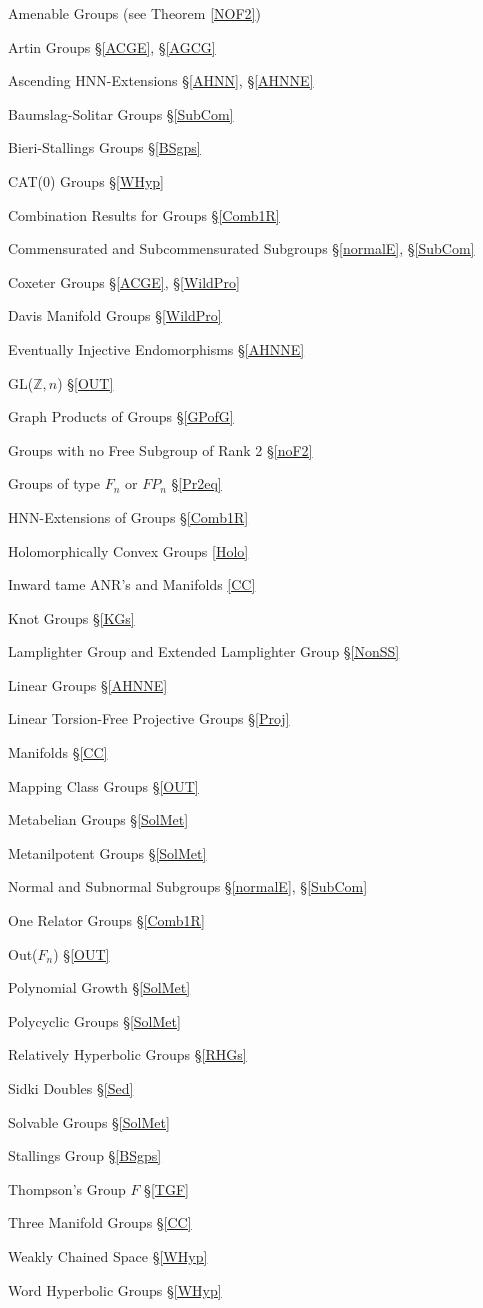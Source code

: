 \documentclass[12pt]{article}
\begin{document}
Amenable Groups (see Theorem \ref{NOF2})

Artin Groups \S \ref{ACGE}, \S \ref{AGCG}

Ascending HNN-Extensions \S \ref{AHNN}, \S \ref{AHNNE}

Baumslag-Solitar Groups \S \ref{SubCom}

Bieri-Stallings Groups \S \ref{BSgps}

CAT(0) Groups \S \ref{WHyp}

Combination Results for Groups \S \ref{Comb1R}

Commensurated and Subcommensurated Subgroups \S \ref{normalE}, \S \ref{SubCom} 

Coxeter Groups \S \ref{ACGE}, \S \ref{WildPro}

Davis Manifold Groups \S \ref{WildPro}

Eventually Injective Endomorphisms  \S \ref{AHNNE}

GL($\mathbb Z, n$)  \S \ref{OUT} 

Graph Products of Groups \S \ref{GPofG}

Groups with no Free Subgroup of Rank 2 \S \ref{noF2}

Groups of type $F_n$ or $FP_n$ \S \ref{Pr2eq}

HNN-Extensions of Groups \S \ref{Comb1R}

Holomorphically Convex Groups \ref{Holo}

Inward tame ANR's and Manifolds \ref{CC}

Knot Groups \S \ref{KGs}

Lamplighter Group and Extended Lamplighter Group \S \ref{NonSS}

Linear Groups \S \ref{AHNNE}

Linear Torsion-Free Projective Groups \S \ref{Proj}

Manifolds \S \ref{CC}

Mapping Class Groups  \S \ref{OUT} 

Metabelian Groups \S \ref{SolMet}

Metanilpotent Groups \S \ref{SolMet}

Normal and Subnormal Subgroups \S \ref{normalE}, \S \ref{SubCom} 

One Relator Groups \S \ref{Comb1R}

Out($F_n$)  \S \ref{OUT} 

Polynomial Growth \S \ref{SolMet}

Polycyclic Groups \S \ref{SolMet}

Relatively Hyperbolic Groups \S \ref{RHGs}

Sidki Doubles \S \ref{Sed}

Solvable Groups \S \ref{SolMet}

Stallings Group \S \ref{BSgps}

Thompson's Group $F$ \S \ref{TGF}

Three Manifold Groups \S \ref{CC}

Weakly Chained Space \S \ref{WHyp}

Word Hyperbolic Groups \S \ref{WHyp}


{}
\end{document}
